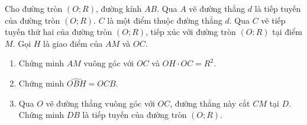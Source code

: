 \begin{bt}%
	Cho đường tròn $(O;R)$, đường kính $AB$. Qua $A$ vẽ đường thẳng $d$ là tiếp tuyến của đường tròn $(O;R)$. $C$ là một điểm thuộc đường thẳng $d$. Qua $C$ vẽ tiếp tuyến thứ hai của đường tròn $(O;R)$, tiếp xúc với đường tròn $(O:R)$ tại điểm $M$. Gọi $H$ là giao điểm của $AM$ và $OC$.
	\begin{enumerate}
		\item Chứng minh $AM$ vuông góc với $OC$ và $OH\cdot OC= R^2$.
		\item Chứng minh $\widehat{OBH}=\widehat{OCB}$.
		\item Qua $O$ vẽ đường thẳng vuông góc với $OC$, đường thẳng này cắt $CM$ tại $D$. Chứng minh $DB$ là tiếp tuyến của đường tròn $(O;R)$.
	\end{enumerate}
\end{bt}
